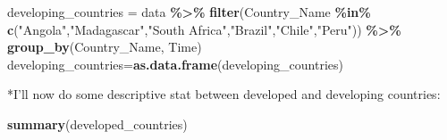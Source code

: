 \documentclass[
]{article}
\newenvironment{Shaded}{\begin{snugshade}}{\end{snugshade}}
\newcommand{\FunctionTok}[1]{\textcolor[rgb]{0.13,0.29,0.53}{\textbf{#1}}}
\newcommand{\NormalTok}[1]{#1}
\newcommand{\OtherTok}[1]{\textcolor[rgb]{0.56,0.35,0.01}{#1}}
\newcommand{\SpecialCharTok}[1]{\textcolor[rgb]{0.81,0.36,0.00}{\textbf{#1}}}
\newcommand{\StringTok}[1]{\textcolor[rgb]{0.31,0.60,0.02}{#1}}
\begin{document}
\begin{Shaded}
\begin{Highlighting}[]
\NormalTok{developing\_countries }\OtherTok{=}\NormalTok{ data }\SpecialCharTok{\%\textgreater{}\%}
  \FunctionTok{filter}\NormalTok{(Country\_Name }\SpecialCharTok{\%in\%} \FunctionTok{c}\NormalTok{(}\StringTok{"Angola"}\NormalTok{,}\StringTok{"Madagascar"}\NormalTok{,}\StringTok{"South Africa"}\NormalTok{,}\StringTok{"Brazil"}\NormalTok{,}\StringTok{"Chile"}\NormalTok{,}\StringTok{"Peru"}\NormalTok{)) }\SpecialCharTok{\%\textgreater{}\%}
  \FunctionTok{group\_by}\NormalTok{(Country\_Name, Time)}
\NormalTok{developing\_countries}\OtherTok{=}\FunctionTok{as.data.frame}\NormalTok{(developing\_countries)}
\end{Highlighting}
\end{Shaded}

*I'll now do some descriptive stat between developed and developing
countries:

\begin{Shaded}
\begin{Highlighting}[]
\FunctionTok{summary}\NormalTok{(developed\_countries)}
\end{Highlighting}
\end{Shaded}
\end{document}
